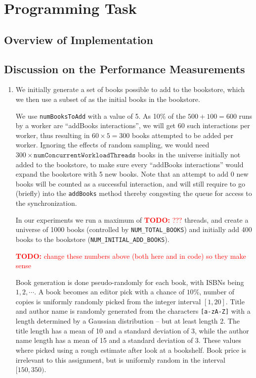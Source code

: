 \documentclass[11pt,a4paper,english]{article}
\newcommand{\todo}[1]{\textcolor{red}{\textbf{TODO: }#1}}
\begin{document}
\begin{enumerate}
\end{enumerate}

\section*{Programming Task}
\subsection*{Overview of Implementation}
\subsection*{Discussion on the Performance Measurements}
\begin{enumerate}
\item We initially generate a set of books possible to add to the bookstore,
  which we then use a subset of as the initial books in the bookstore.

  We use \verb|numBooksToAdd| with a value of 5. As 10\% of the $500+100 = 600$
  runs by a worker are ``addBooks interactions'', we will get $60$ such
  interactions per worker, thus resulting in $60 \times 5 = 300$ books attempted
  to be added per worker. Ignoring the effects of random sampling, we would need
  $300 \times \mathtt{numConcurrentWorkloadThreads}$ books in the universe
  initially not added to the bookstore, to make sure every ``addBooks
  interactions'' would expand the bookstore with 5 new books. Note that an
  attempt to add 0 new books will be counted as a successful interaction, and
  will still require to go (briefly) into the \verb|addBooks| method thereby
  congesting the queue for access to the synchronization.

  In our experiments we run a maximum of \todo{???} threads, and create a
  universe of 1000 books (controlled by \verb|NUM_TOTAL_BOOKS|) and initially
  add 400 books to the bookstore (\verb|NUM_INITIAL_ADD_BOOKS|).

  \todo{change these numbers above (both here and in code) so they make sense}

  Book generation is done pseudo-randomly for each book, with ISBNs being
  $1,2,\cdots$. A book becomes an editor pick with a chance of $10\%$, number of
  copies is uniformly randomly picked from the integer interval $[1,20]$. Title
  and author name is randomly generated from the characters \verb|[a-zA-Z]| with
  a length determined by a Gaussian distribution -- but at least length 2. The
  title length has a mean of 10 and a standard deviation of 3, while the author
  name length has a mean of 15 and a standard deviation of 3. These values where
  picked using a rough estimate after look at a bookshelf. Book price is
  irrelevant to this assignment, but is uniformly random in the interval
  $[150,350)$.


\end{enumerate}
\end{document}
